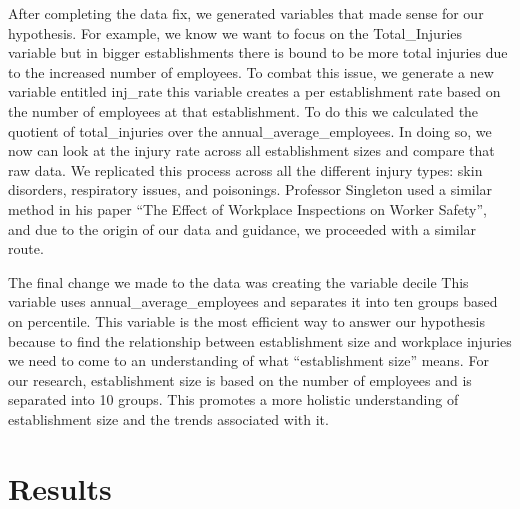 \documentclass[12pt]{article}
\begin{document}
After completing the data fix, we generated variables that made sense for our hypothesis. For example, we know we want to focus on the Total\_Injuries variable but in bigger establishments there is bound to be more total injuries due to the increased number of employees. To combat this issue, we generate a new variable entitled inj\_rate this variable creates a per establishment rate based on the number of employees at that establishment. To do this we calculated the quotient of total\_injuries over the annual\_average\_employees. In doing so, we now can look at the injury rate across all establishment sizes and compare that raw data. We replicated this process across all the different injury types: skin disorders, respiratory issues, and poisonings. Professor Singleton used a similar method in his paper “The Effect of Workplace Inspections on Worker Safety”, and due to the origin of our data and guidance, we proceeded with a similar route.

The final change we made to the data was creating the variable decile This variable uses annual\_average\_employees and separates it into ten groups based on percentile. This variable is the most efficient way to answer our hypothesis because to find the relationship between establishment size and workplace injuries we need to come to an understanding of what “establishment size” means. For our research, establishment size is based on the number of employees and is separated into 10 groups. This promotes a more holistic understanding of establishment size and the trends associated with it.

\section{Results}
\label{sec:result}
\end{document}
